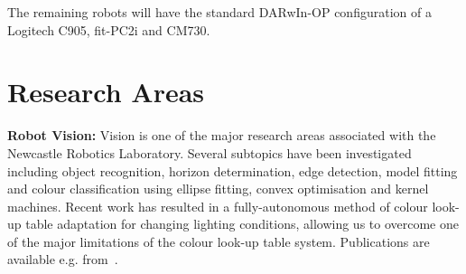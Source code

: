 \documentclass{llncs}
\begin{document}





The remaining robots will have the standard DARwIn-OP configuration of a Logitech C905, fit-PC2i and CM730.

\section{Research Areas}

\noindent\textbf{Robot Vision:} Vision is one of the major research areas associated with the Newcastle Robotics Laboratory. Several subtopics have been investigated including object recognition, horizon determination, edge detection, model fitting and colour classification using ellipse fitting, convex optimisation and kernel machines. Recent work has resulted in a fully-autonomous method of colour look-up table adaptation for changing lighting conditions, allowing us to overcome one of the major limitations of the colour look-up table system. Publications are available e.g. from~\cite{budden2012colour,budden2012ball,henderson_2007,nickin_2007,NUBOT2006,Henderson2008,flannery2013ransac,budden2013salient}.
\\
\end{document}

